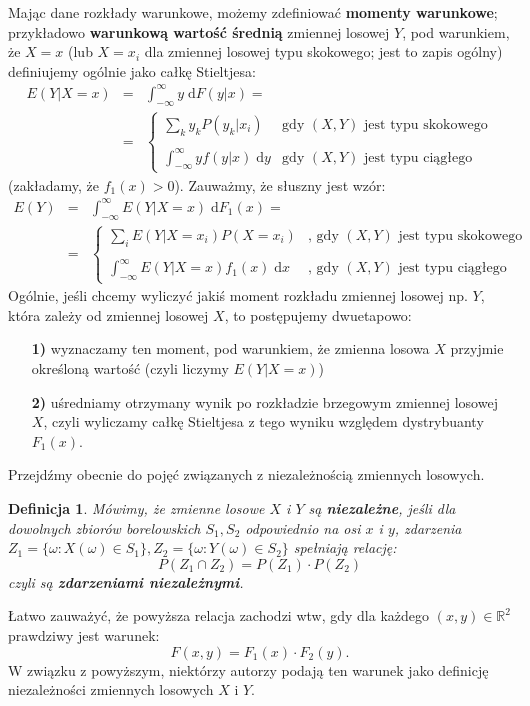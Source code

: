 \documentclass[10pt,a4paper]{article}
\newtheorem{definition}{Definicja}[section]
\newcommand{\dd}{\; \mathrm{d}}
\begin{document}
Mając dane rozkłady warunkowe, możemy zdefiniować \textbf{momenty warunkowe}; przykładowo \textbf{warunkową wartość średnią} zmiennej losowej $Y$, pod warunkiem, że $X=x$
 (lub $X=x_i$ dla zmiennej losowej typu skokowego; jest to zapis ogólny) definiujemy ogólnie jako całkę Stieltjesa:
\begin{eqnarray}
E(Y|X=x) & = & \int_{-\infty}^{\infty}y\dd{F(y|x)} = \\
\nonumber
& = & \left\{ \begin{array}{ll}
\sum_ky_kP(y_k|x_i) & \textrm{gdy $(X,Y)$ jest typu skokowego}\\ \\
\int_{-\infty}^{\infty}yf(y|x)\dd{y} & \textrm{gdy $(X,Y)$ jest typu ciągłego}
\end{array} \right.
\end{eqnarray}
(zakładamy, że $f_1(x)>0$). Zauważmy, że słuszny jest wzór:
\begin{eqnarray}
E(Y) & = & \int_{-\infty}^{\infty}E(Y|X=x)\dd{F_1(x)} = \\
\nonumber
& = & \left\{ \begin{array}{ll}
\sum_iE(Y|X=x_i)P(X=x_i) & \textrm{, gdy $(X,Y)$ jest typu skokowego}\\ \\
\int_{-\infty}^{\infty}E(Y|X=x)f_1(x)\dd{x} & \textrm{, gdy $(X,Y)$ jest typu ciągłego}
\end{array} \right.
\end{eqnarray}
Ogólnie, jeśli chcemy wyliczyć jakiś moment rozkładu zmiennej losowej np. $Y$, która zależy od zmiennej losowej $X$, to postępujemy dwuetapowo: 
\begin{enumerate}
 \item[\textbf{1)}] wyznaczamy ten moment, pod warunkiem, że zmienna losowa $X$ przyjmie określoną wartość (czyli liczymy $E(Y|X=x)$)
\item[\textbf{2)}] uśredniamy otrzymany wynik po rozkładzie brzegowym zmiennej losowej $X$, czyli wyliczamy całkę Stieltjesa z tego wyniku względem dystrybuanty $F_1(x)$.
\end{enumerate}
Przejdźmy obecnie do pojęć związanych z niezależnością zmiennych losowych.
\begin{definition}
Mówimy, że zmienne losowe $X$ i $Y$ są \textbf{niezależne}, jeśli dla dowolnych zbiorów borelowskich $S_1,S_2$ odpowiednio na osi $x$ i $y$, zdarzenia \\
$Z_1=\{\omega:X(\omega)\in S_1\}, Z_2=\{\omega:Y(\omega)\in S_2\}$ spełniają relację:
\begin{equation}
P(Z_1\cap Z_2) = P(Z_1)\cdot P(Z_2)
\end{equation}
czyli są \textbf{zdarzeniami niezależnymi}.
\end{definition}
Łatwo zauważyć, że powyższa relacja zachodzi wtw, gdy dla każdego $(x,y)\in\mathbb{R}^2$ prawdziwy jest warunek:
\[F(x,y)=F_1(x)\cdot F_2(y).\]
W związku z powyższym, niektórzy autorzy podają ten warunek jako definicję niezależności zmiennych losowych $X$ i $Y$.
\end{document}

